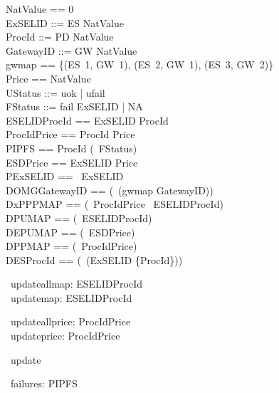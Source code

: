 
\begin{zed}
	NatValue == 0 \\
	ExSELID ::= ES  \upto NatValue \rdata \\
	ProcId ::= PD  \upto NatValue \rdata \\
	GatewayID ::= GW  \upto NatValue \rdata\\
	gwmap == \{(ES~1, GW~1), (ES~2, GW~1), (ES~3, GW~2)\}\\
	Price == NatValue\\ %
	UStatus ::= uok | ufail\\
	FStatus ::= fail \ldata ExSELID \rdata | NA\\
	ESELIDProcId == ExSELID \pfun ProcId\\ %
	ProcIdPrice == ProcId \pfun Price\\ %
	PIPFS == ProcId \pfun (\power~FStatus)\\ %
	ESDPrice == ExSELID \pfun Price\\ %
	PExSELID == \power~ExSELID\\ %
	DOMGGatewayID ==  (\dom~(gwmap \rres GatewayID))\\
	DxPPPMAP == (\dom~ProcIdPrice \setminus \ran~ESELIDProcId)\\
	DPUMAP == (\dom~ESELIDProcId)\\
	DEPUMAP == (\dom~ESDPrice)\\
	DPPMAP == (\dom~ProcIdPrice)\\
	DESProcId == (\dom~(ExSELID \rres \{ProcId\}))
\end{zed}

\begin{circus}
	\circchannel\ updateallmap: ESELIDProcId \\
	\circchannel\ updatemap: ESELIDProcId
\end{circus}

\begin{circus}
	\circchannel\ updateallprice: ProcIdPrice \\
	\circchannel\ updateprice: ProcIdPrice
\end{circus}

\begin{circus}
	\circchannel\ update
\end{circus}

\begin{circus}
	\circchannel\ failures: PIPFS
\end{circus}

